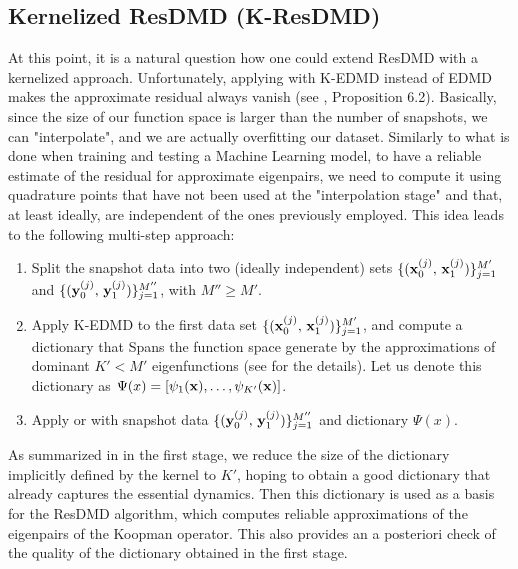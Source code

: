 \subsection{Kernelized ResDMD (K-ResDMD)}
At this point, it is a natural question how one could extend ResDMD with a kernelized approach. Unfortunately, applying  with K-EDMD instead of EDMD makes the approximate residual always vanish (see \cite{colbrook_rigorous_2021}, Proposition 6.2). Basically, since the size of our function space is larger than the number of snapshots, we can "interpolate", and we are actually overfitting our dataset. Similarly to what is done when training and testing a Machine Learning model, to have a reliable estimate of the residual for approximate eigenpairs, we need to compute it using quadrature points that have not been used at the "interpolation stage" and that, at least ideally, are independent of the ones previously employed. This idea leads to the following multi-step approach:
\begin{enumerate}
    \item Split the snapshot data into two (ideally independent) sets $\{(\vb{x}_0^{(j)},\,\vb{x}_1^{(j)})\}_{j=1}^{M'}$ and  $\{(\vb{y}_0^{(j)},\,\vb{y}_1^{(j)})\}_{j=1}^{M''}$, with $M'' \geq M'$.
    \item Apply K-EDMD to the first data set $\{(\vb{x}_0^{(j)},\,\vb{x}_1^{(j)})\}_{j=1}^{M'}$, and compute a dictionary that Spans the function space generate by the approximations of dominant $K' < M'$ eigenfunctions (see  for the details). Let us denote this dictionary as $\Psi(x) = \left[\psi_1(\vb{x}), \dots, \psi_{K'}(\vb{x})\right]$.
    \item Apply  or  with snapshot data $\{(\vb{y}_0^{(j)},\,\vb{y}_1^{(j)})\}_{j=1}^{M''}$ and dictionary $\Psi(x)$.
\end{enumerate}
As summarized in  in the first stage, we reduce the size of the dictionary implicitly defined by the kernel to $K'$, hoping to obtain a good dictionary that already captures the essential dynamics. Then this dictionary is used as a basis for the ResDMD algorithm, which computes reliable approximations of the eigenpairs of the Koopman operator. This also provides an a posteriori check of the quality of the dictionary obtained in the first stage.


